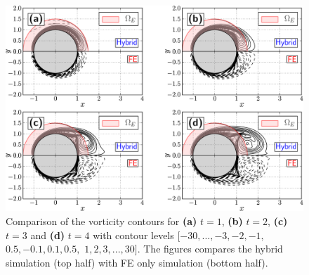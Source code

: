 	\begin{figure}[!t]
	\centering
	\includegraphics[width=\linewidth]{./figures/validation/isc/hybrid_diffTs-crop.pdf}
	\caption{Comparison of the vorticity contours for \textbf{(a)} $t=1$, \textbf{(b)} $t=2$, \textbf{(c)} $t=3$ and \textbf{(d)} $t=4$ with contour levels $[-30,..., -3, -2, -1,$ $0.5, -0.1, 0.1, 0.5,$ $1, 2, 3,..., 30]$. The figures compares the hybrid simulation (top half) with FE only simulation (bottom half).}
	\label{fig:hybrid_cylinder_contourComparison_tStarting}
	\end{figure}

